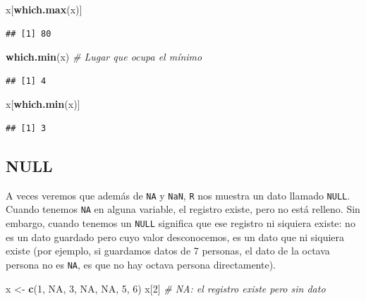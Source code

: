 \documentclass[11pt,]{book}
\newenvironment{Shaded}{\begin{snugshade}}{\end{snugshade}}
\newcommand{\CommentTok}[1]{\textcolor[rgb]{0.37,0.37,0.37}{\textit{#1}}}
\newcommand{\DecValTok}[1]{\textcolor[rgb]{0.06,0.06,0.06}{#1}}
\newcommand{\KeywordTok}[1]{\textcolor[rgb]{0.27,0.27,0.27}{\textbf{#1}}}
\newcommand{\NormalTok}[1]{#1}
\newcommand{\OtherTok}[1]{\textcolor[rgb]{0.37,0.37,0.37}{#1}}
\newcommand{\StringTok}[1]{\textcolor[rgb]{0.5,0.5,0.5}{#1}}
\begin{document}
\begin{Shaded}
\begin{Highlighting}[]
\NormalTok{x[}\KeywordTok{which.max}\NormalTok{(x)]}
\end{Highlighting}
\end{Shaded}

\begin{verbatim}
## [1] 80
\end{verbatim}

\begin{Shaded}
\begin{Highlighting}[]
\KeywordTok{which.min}\NormalTok{(x) }\CommentTok{# Lugar que ocupa el mínimo}
\end{Highlighting}
\end{Shaded}

\begin{verbatim}
## [1] 4
\end{verbatim}

\begin{Shaded}
\begin{Highlighting}[]
\NormalTok{x[}\KeywordTok{which.min}\NormalTok{(x)]}
\end{Highlighting}
\end{Shaded}

\begin{verbatim}
## [1] 3
\end{verbatim}

\hypertarget{null}{%
\subsection{NULL}\label{null}}

A veces veremos que además de \texttt{NA} y \texttt{NaN}, \texttt{R} nos muestra un dato llamado \texttt{NULL}. Cuando tenemos \texttt{NA} en alguna variable, el registro existe, pero no está relleno. Sin embargo, cuando tenemos un \texttt{NULL} significa que ese registro ni siquiera existe: no es un dato guardado pero cuyo valor desconocemos, es un dato que ni siquiera existe (por ejemplo, si guardamos datos de 7 personas, el dato de la octava persona no es \texttt{NA}, es que no hay octava persona directamente).

\begin{Shaded}
\begin{Highlighting}[]
\NormalTok{x <-}\StringTok{ }\KeywordTok{c}\NormalTok{(}\DecValTok{1}\NormalTok{, }\OtherTok{NA}\NormalTok{, }\DecValTok{3}\NormalTok{, }\OtherTok{NA}\NormalTok{, }\OtherTok{NA}\NormalTok{, }\DecValTok{5}\NormalTok{, }\DecValTok{6}\NormalTok{)}
\NormalTok{x[}\DecValTok{2}\NormalTok{] }\CommentTok{# NA: el registro existe pero sin dato}
\end{Highlighting}
\end{Shaded}
\end{document}
